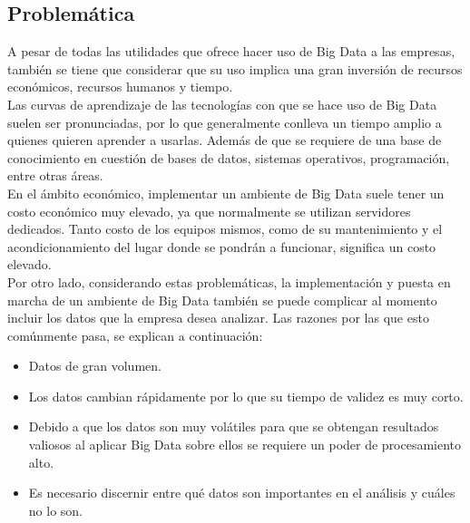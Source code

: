 \subsection{Problemática}
A pesar de todas las utilidades que ofrece hacer uso de Big Data a las empresas, también se tiene que considerar que su uso implica una gran inversión de recursos económicos, recursos humanos y tiempo. 
\\
Las curvas de aprendizaje de las tecnologías con que se hace uso de Big Data suelen ser pronunciadas, por lo que generalmente conlleva un tiempo amplio a quienes quieren aprender a usarlas. Además de que se requiere de una base de conocimiento en cuestión de bases de datos, sistemas operativos, programación, entre otras áreas. 
\\
En el ámbito económico, implementar un ambiente de Big Data suele tener un costo económico muy elevado, ya que normalmente se utilizan servidores dedicados. Tanto costo de los equipos mismos, como de su mantenimiento y el acondicionamiento del lugar donde se pondrán a funcionar, significa un costo elevado.\\
Por otro lado, considerando estas problemáticas, la implementación y puesta en marcha de un ambiente de Big Data también se puede complicar al momento incluir los datos que la empresa desea analizar. Las razones por las que esto comúnmente pasa, se explican a continuación:
\begin{itemize}
	\item Datos de gran volumen.\cite{refi2}\\
	\item Los datos cambian rápidamente por lo que su tiempo de validez es muy corto.\cite{refi2}\\
	\item Debido a que los datos son muy volátiles para que se obtengan resultados valiosos al aplicar Big Data sobre ellos se requiere un poder de procesamiento alto. \\
	\item Es necesario discernir entre qué datos son importantes en el análisis y cuáles no lo son.\cite{refi2}\\
\end{itemize}  

